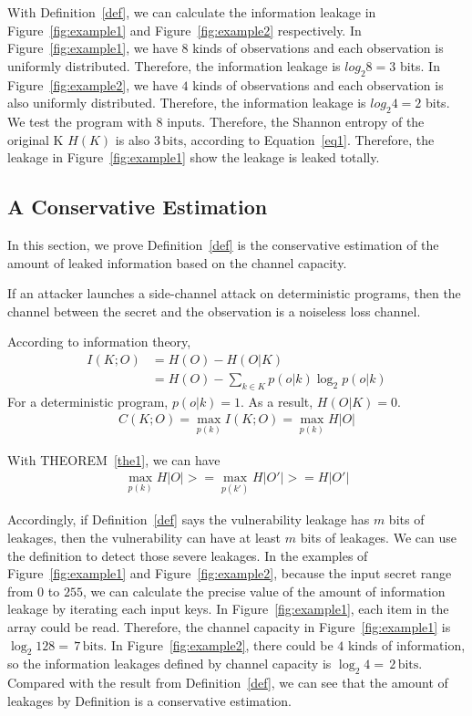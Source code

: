 With Definition~\ref{def}, we can calculate the information leakage in Figure~\ref{fig:example1} and Figure~\ref{fig:example2} respectively. In Figure~\ref{fig:example1}, we have $8$ kinds of observations and each observation is uniformly distributed. Therefore, the information leakage is $log_2{8} = 3$ bits. In Figure~\ref{fig:example2}, we have $4$ kinds of observations and each observation is also uniformly distributed. Therefore, the information leakage is $log_2{4} = 2$ bits. We test the program with $8$ inputs. Therefore, the Shannon entropy of the original K $H(K)$ is also $3\,\mathrm{bits}$, according to Equation~\ref{eq1}. Therefore, the leakage in Figure~\ref{fig:example1} show the leakage is leaked totally.

\subsection{A Conservative Estimation}
In this section, we prove Definition~\ref{def} is the conservative estimation of the amount of leaked information based on the channel capacity. 

\begin{theorem}\label{the1}
If an attacker launches a side-channel attack on  deterministic programs, then the channel between the secret and the observation is a noiseless loss channel.
\end{theorem}

\begin{myprof}
According to information theory,
\begin{align*}
     I(K;O) & = H(O) - H(O|K) \\
            & = H(O) - \sum_{k {\in} K }{p(o|k)\log_2p(o|k)}
\end{align*}
For a deterministic program, $p(o|k)=1$. As a result, $H(O|K) = 0$.
\begin{align*}
     C(K;O) = \max_{p(k)} I(K;O) = \max_{p(k)} H |O| 
\end{align*}
\end{myprof}

With THEOREM~\ref{the1}, we can have
\begin{align*}
     \max_{p(k)} H |O| >= \max_{p(k')} H |O'| >= H |O'|
\end{align*}

Accordingly, if Definition~\ref{def} says the vulnerability leakage has $m$ bits of leakages, then the vulnerability can have at least $m$ bits of leakages. We can use the definition to detect those severe leakages. In the examples of Figure~\ref{fig:example1} and Figure~\ref{fig:example2}, because the input secret range from $0$ to $255$, we can calculate the precise value of the amount of information leakage by iterating each input keys. In Figure~\ref{fig:example1}, each item in the array could be read. Therefore, the channel capacity in Figure~\ref{fig:example1} is $\log_2{128} = \,7\, \mathrm{bits}$. In Figure~\ref{fig:example2}, there could be $4$ kinds of information, so the information leakages defined by channel capacity is $\log_2{4} = \,2\, \mathrm{bits}$. Compared with the result from Definition~\ref{def}, we can see that the amount of leakages by Definition is a conservative estimation.

